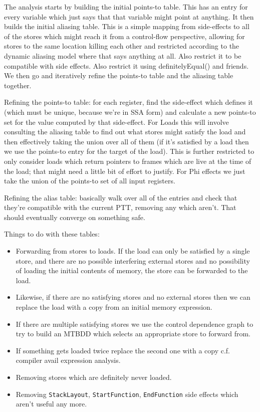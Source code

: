 The analysis starts by building the initial points-to table.  This has
an entry for every variable which just says that that variable might
point at anything.  It then builds the initial aliasing table.  This is a
simple mapping from  side-effects to all of the stores
which might reach it from a control-flow perspective, allowing for
stores to the same location killing each other and restricted
according to the dynamic aliasing model where that says anything at
all.  Also restrict it to be compatible with 
side effects.  Also restrict it using definitelyEqual() and friends.
We then go and iteratively refine the points-to table and the aliasing
table together.

Refining the points-to table: for each register, find the side-effect
which defines it (which must be unique, because we're in SSA form) and
calculate a new points-to set for the value computed by that
side-effect.  For Loads this will involve consulting the aliasing
table to find out what stores might satisfy the load and then
effectively taking the union over all of them (if it's satisfied by a
load then we use the points-to entry for the target of the load).
This is further restricted to only consider loads which return
pointers to frames which are live at the time of the load; that might
need a little bit of effort to justify.  For Phi effects we just take
the union of the points-to set of all input registers.

Refining the alias table: basically walk over all of the entries and
check that they're compatible with the current PTT, removing any which
aren't.  That should eventually converge on something safe.

Things to do with these tables:

\begin{itemize}
\item
  Forwarding from stores to loads.  If the load can only be satisfied
  by a single store, and there are no possible interfering external
  stores and no possibility of loading the initial contents of memory,
  the store can be forwarded to the load.
\item
  Likewise, if there are no satisfying stores and no external stores
  then we can replace the load with a copy from an initial memory
  expression.
\item
  If there are multiple satisfying stores we use the control
  dependence graph\needCite{} to try to build an MTBDD which selects
  an appropriate store to forward from.
\item
  If something gets loaded twice replace the second one with a copy
  c.f. compiler avail expression analysis.
\item
  Removing stores which are definitely never loaded.
\item
  Removing \verb|StackLayout|, \verb|StartFunction|,
  \verb|EndFunction| side effects which aren't useful any more.
\end{itemize}

